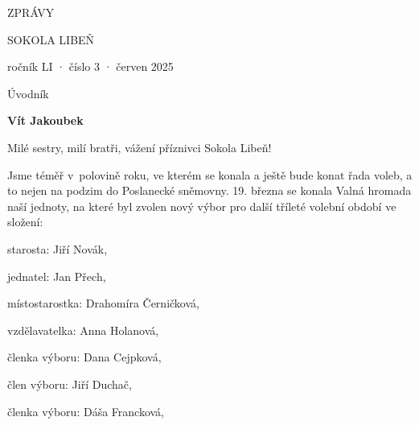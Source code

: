 \documentclass[11pt]{article}
\begin{document}
\pagecolor{sokolred}
\color{white}
\begin{center}

\vspace*{\fill}

{\titlesize \fugner ZPRÁVY}

{\titlesize \tyrs SOKOLA LIBEŇ}

\vspace*{1cm}

{\large ročník LI · číslo 3 · červen 2025}

\vspace*{\fill}
\end{center}

\clearpage
\normalcolor
\nopagecolor
{}

\pagestyle{uvodnik}

\setlength{\columnsep}{-2.5cm}
\begin{multicols}{2}
  {\fontsize{48pt}{57pt} \fugner \color{sokolred} \noindent Úvodník}

  \columnbreak

  \vspace*{-4pt}

  {\hfill\textbf{Vít Jakoubek}}
  
 \end{multicols}

\vspace*{12pt}

\noindent
Milé sestry, milí bratři, vážení příznivci Sokola Libeň!

\noindent
Jsme téměř v~polovině roku, ve kterém se konala a ještě bude konat řada
voleb, a to nejen na podzim do Poslanecké sněmovny. 19. března se konala
Valná hromada naší jednoty, na které byl zvolen nový výbor pro další
tříleté volební období ve složení:

\vspace*{12pt}

starosta: Jiří Novák,

jednatel: Jan Přech,

místostarostka: Drahomíra Černičková,

vzdělavatelka: Anna Holanová,

členka výboru: Dana Cejpková,

člen výboru: Jiří Duchač,

členka výboru: Dáša Francková,
\end{document}
